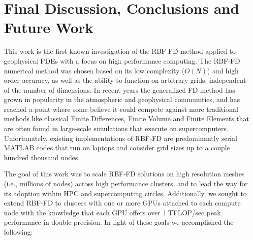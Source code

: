 \chapter{Final Discussion, Conclusions and Future Work}
\label{chap:conclusions}

This work is the first known investigation of the RBF-FD method applied to geophysical PDEs with a focus on high performance computing. The RBF-FD numerical method was chosen based on its low complexity ($O(N)$) and high order accuracy, as well as the ability to function on arbitrary grids, independent of the number of dimensions. In recent years the generalized FD method has grown in popularity in the atmospheric and geophysical communities, and has reached a point where some believe it could compete against more traditional methods like classical Finite Differences, Finite Volume and Finite Elements that are often found in large-scale simulations that execute on supercomputers. Unfortunately, existing implementations of RBF-FD are predominantly serial MATLAB codes that run on laptops and consider grid sizes up to a couple hundred thousand nodes.


The goal of this work was to scale RBF-FD solutions on high resolution meshes (i.e., millions of nodes) across high performance clusters, and to lead the way for its adoption within HPC and supercomputing circles. Additionally, we sought to extend RBF-FD to clusters with one or more GPUs attached to each compute node with the knowledge that each GPU offers over 1 TFLOP/sec peak performance in double precision. In light of these goals we accomplished the following: 

